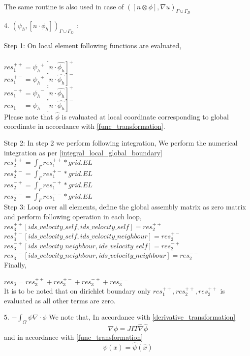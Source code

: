 \documentclass[a4paper,12pt]{book}
\begin{document}
The same routine is also used in case of $([n \otimes \phi],{\nabla u})_{\Gamma \cup \Gamma_D}$

4. $({\psi_h}, [n \cdot \phi_h])_{\Gamma \cup \Gamma_D}$ :

Step 1: On local element following functions are evaluated,\\
\\
$res_1^{++} = {\psi_h}^+ [n \cdot \hat{\phi_h}]^+$\\
$res_1^{+-} = {\psi_h}^+ [n \cdot \hat{\phi_h}]^-$\\
$res_1^{-+} = {\psi_h}^- [n \cdot \hat{\phi_h}]^+$\\
$res_1^{--} = {\psi_h}^- [n \cdot \hat{\phi_h}]^-$\\

Please note that $\hat{\phi}$ is evaluated at local coordinate corresponding to global coordinate in accordance with \ref{func_transformation}.

Step 2: In step 2 we perform following integration, 
We perform the numerical integration as per \ref{integral_local_global_boundary}
\\ 
$res_2^{++} = \int_{\Gamma} res_1^{++} * grid.EL$\\
$res_2^{+-} = \int_{\Gamma} res_1^{+-} * grid.EL$\\
$res_2^{-+} = \int_{\Gamma} res_1^{-+} * grid.EL$\\
$res_2^{--} = \int_{\Gamma} res_1^{--} * grid.EL$\\

Step 3: Loop over all elements, define the global assembly matrix as zero matrix and perform following operation in each loop,
\\
$res_3^{++}[ids\_velocity\_self,ids\_velocity\_self] = res_2^{++}$\\
$res_3^{+-}[ids\_velocity\_self,ids\_velocity\_neighbour] = res_2^{+-}$\\
$res_3^{-+}[ids\_velocity\_neighbour,ids\_velocity\_self] = res_2^{-+}$\\
$res_3^{--}[ids\_velocity\_neighbour,ids\_velocity\_neighbour] = res_2^{--}$\\

Finally,

$res_3 = res_3^{++} + res_3^{+-} + res_3^{-+} + res_3^{--}$\\

It is to be noted that on dirichlet boundary only $res_1^{++}, res_2^{++}, res_3^{++}$ is evaluated as all other terms are zero.

5. $-\int_{\Omega} \psi \nabla \cdot \phi$
We note that, In accordance with \ref{derivative_transformation}\begin{equation}
\nabla \phi = JIT \hat{\nabla} \hat{\phi}
\end{equation}
and in accordance with \ref{func_transformation}
\begin{equation}
\psi(x) = \hat{\psi} (\hat{x})
\end{equation}
\end{document}
